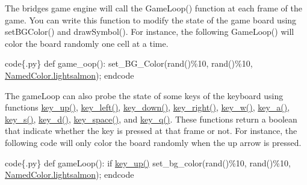 The bridges game engine will call the Game\+Loop() function at each frame of the game. You can write this function to modify the state of the game board using set\+B\+G\+Color() and draw\+Symbol(). For instance, the following Game\+Loop() will color the board randomly one cell at a time.

code\{.py\} def game\+\_\+oop()\+: set\+\_\+\+B\+G\+\_\+\+Color(rand()\%10, rand()\%10, \hyperlink{classbridges_1_1named__color_1_1_named_color_a616e82749b8c7711ede2554ce8e3a879}{Named\+Color.\+lightsalmon}); endcode

The game\+Loop can also probe the state of some keys of the keyboard using functions \hyperlink{classbridges_1_1non__blocking__game_1_1_non_blocking_game_a7e853081cefe51511de0c6438aeea871}{key\+\_\+up()}, \hyperlink{classbridges_1_1non__blocking__game_1_1_non_blocking_game_a87490ef28d161f22e753aab5d3e67e46}{key\+\_\+left()}, \hyperlink{classbridges_1_1non__blocking__game_1_1_non_blocking_game_af9a280c2d221140eddba0e4bcb0afb9b}{key\+\_\+down()}, \hyperlink{classbridges_1_1non__blocking__game_1_1_non_blocking_game_a31b6f78c39a93f0ba5350d346043bde9}{key\+\_\+right()}, \hyperlink{classbridges_1_1non__blocking__game_1_1_non_blocking_game_abeb435c75a3022c50f472ee2a4207809}{key\+\_\+w()}, \hyperlink{classbridges_1_1non__blocking__game_1_1_non_blocking_game_a7076d0ff62aeba49a0caf71e213361db}{key\+\_\+a()}, \hyperlink{classbridges_1_1non__blocking__game_1_1_non_blocking_game_a2c587b12c3a8bc2b2e96bd2d09ceed1d}{key\+\_\+s()}, \hyperlink{classbridges_1_1non__blocking__game_1_1_non_blocking_game_a0c90fcb365dcdb7ccf49b98b3e63ecc8}{key\+\_\+d()}, \hyperlink{classbridges_1_1non__blocking__game_1_1_non_blocking_game_a1059ffd8d5daa3a0db2e6847f5724883}{key\+\_\+space()}, and \hyperlink{classbridges_1_1non__blocking__game_1_1_non_blocking_game_a75e94a930466b607828b6ef092f810d6}{key\+\_\+q()}. These functions return a boolean that indicate whether the key is pressed at that frame or not. For instance, the following code will only color the board randomly when the up arrow is pressed.

code\{.py\} def game\+Loop()\+: if \hyperlink{classbridges_1_1non__blocking__game_1_1_non_blocking_game_a7e853081cefe51511de0c6438aeea871}{key\+\_\+up()} set\+\_\+bg\+\_\+color(rand()\%10, rand()\%10, \hyperlink{classbridges_1_1named__color_1_1_named_color_a616e82749b8c7711ede2554ce8e3a879}{Named\+Color.\+lightsalmon}); endcode

